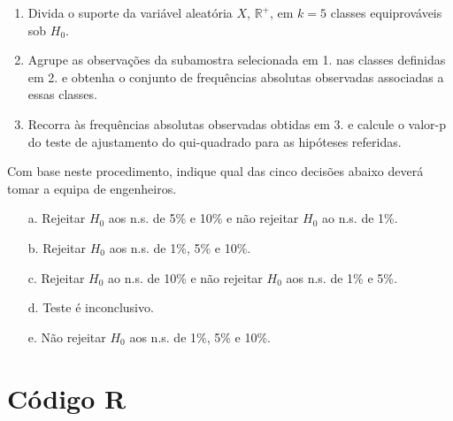 \documentclass[11pt,a4paper]{article}
\begin{document}
\begin{tcolorbox}[colback=blue!5!white,colframe=blue!75!black,title=Teste de Ajustamento de Rayleigh - Exercício 10]
\begin{enumerate}[label=\arabic*.]
    \item Divida o suporte da variável aleatória $X$, $\mathbb{R}^{+}$, em $k=5$ classes equiprováveis sob $H_{0}$.
    
    \item Agrupe as observações da subamostra selecionada em 1. nas classes definidas em 2. e obtenha o conjunto de frequências absolutas observadas associadas a essas classes.
    
    \item Recorra às frequências absolutas observadas obtidas em 3. e calcule o valor-p do teste de ajustamento do qui-quadrado para as hipóteses referidas.
\end{enumerate}

Com base neste procedimento, indique qual das cinco decisões abaixo deverá tomar a equipa de engenheiros.

\begin{itemize}[label=$\circ$]
    \item[\textsf{a.}] Rejeitar $H_{0}$ aos n.s. de 5\% e 10\% e não rejeitar $H_{0}$ ao n.s. de 1\%.
    
    \item[\textsf{b.}] Rejeitar $H_{0}$ aos n.s. de 1\%, 5\% e 10\%.
    
    \item[\textsf{c.}] Rejeitar $H_{0}$ ao n.s. de 10\% e não rejeitar $H_{0}$ aos n.s. de 1\% e 5\%.
    
    \item[\textsf{d.}] Teste é inconclusivo.
    
    \item[\textsf{e.}] Não rejeitar $H_{0}$ aos n.s. de 1\%, 5\% e 10\%.
\end{itemize}

\end{tcolorbox}

\section*{Código R}
\end{document}
